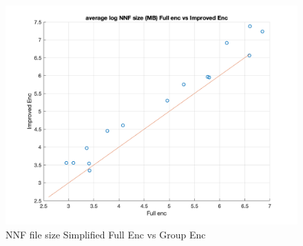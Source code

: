 \begin{figure}
    \centering
    \includegraphics[width = 0.7 \textwidth]{pic/Size_fullvsImproved.png}
    \caption{NNF file size Simplified Full Enc vs Group Enc}
    \label{fig:fullsize_enc1v3}
\end{figure}

